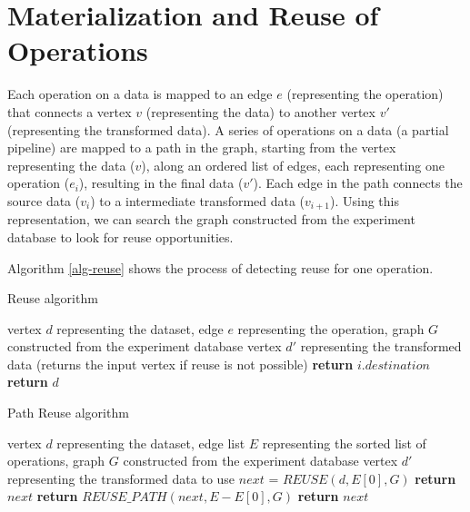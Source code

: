 \section{Materialization and Reuse of Operations}\label{sec-materializaiton-and-reuse}

Each operation on a data is mapped to an edge $e$ (representing the operation) that connects a vertex $v$ (representing the data) to another vertex $v'$ (representing the transformed data).
A series of operations on a data (a partial pipeline) are mapped to a path in the graph, starting from the vertex representing the data ($v$), along an ordered list of edges, each representing one operation ($e_i$), resulting in the final data ($v'$). 
Each edge in the path connects the source data ($v_i$) to a intermediate transformed data ($v_{i+1}$).
Using this representation, we can search the graph constructed from the experiment database to look for reuse opportunities.

Algorithm \ref{alg-reuse} shows the process of detecting reuse for one operation.
\begin{algorithm}
\caption{Reuse algorithm}\label{alg-reuse}
\begin{algorithmic}[1]
\Require vertex $d$ representing the dataset, edge $e$ representing the operation, graph $G$ constructed from the experiment database
\Ensure vertex $d'$ representing the transformed data (returns the input vertex if reuse is not possible)
			 	 
			 		 \State \textbf{return} $i.destination$ 
			 	\EndIf
		\EndFor
	\EndIf
   \State \textbf{return} $d$ 
\EndFunction
\end{algorithmic}
\end{algorithm}

 
\begin{algorithm}
\caption{Path Reuse algorithm}\label{alg-reuse-partial_pipeline}
\begin{algorithmic}[1]
\Require vertex $d$ representing the dataset, edge list $E$ representing the sorted list of operations, graph $G$ constructed from the experiment database
\Ensure vertex $d'$ representing the transformed data to use
	\State $next$ = $REUSE(d, E[0],G)$
		\State \textbf{return} $next$
		\State \textbf{return} $REUSE\_PATH(next, E - E[0], G)$
	\Else
		\State \textbf{return} $next$
	\EndIf
\EndFunction
\end{algorithmic}
\end{algorithm}
 
